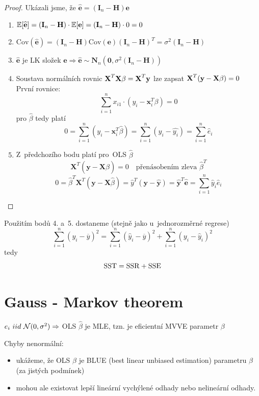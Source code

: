 \begin{proof}
Ukázali jsme, že $\widehat{\textbf{e}} = (\textbf{I}_n - \textbf{H}) \textbf{e}$
\begin{enumerate}
\item $\mathbb{E} [\widehat{\textbf{e}}] = (\textbf{I}_n - \textbf{H}) \cdot \mathbb{E} [\textbf{e}] = (\textbf{I}_n - \textbf{H}) \cdot 0 = 0$
\item $\text{Cov}(\widehat{\textbf{e}}) = (\textbf{I}_n - \textbf{H}) \text{Cov}(\textbf{e}) (\textbf{I}_n - \textbf{H})^T = \sigma^2 (\textbf{I}_n - \textbf{H})$
\item $\widehat{\textbf{e}}$ je LK složek $\textbf{e}  \Rightarrow  \widehat{\textbf{e}} \sim \textbf{N}_n (\textbf{0}, \sigma^2 (\textbf{I}_n - \textbf{H}))$
\item Soustava normálních rovnic $\textbf{X}^T \textbf{X} \beta = \textbf{X}^T \textbf{y}$ lze zapsat $\textbf{X}^T (\textbf{y} - \textbf{X} \beta) = 0$ \\
První rovnice:
 $$
 \sum_{i = 1}^n x_{i1} \cdot (y_i - \textbf{x}_i^T \beta) = 0
 $$
pro $\widehat{\beta}$ tedy platí
 $$
 0 = \sum_{i = 1}^n (y_i - \textbf{x}_i^T \widehat{\beta}) = \sum_{i = 1}^n (y_i - \widehat{y_i}) = \sum_{i = 1}^n \widehat{e}_i
 $$
\item Z~předchozího bodu platí pro~OLS $\widehat{\beta}$
 $$
 \textbf{X}^T (\textbf{y} - \textbf{X} \widehat{\beta}) = 0 \quad \text{přenásobením zleva } \widehat{\beta}^T
 $$
 $$
  0 = \widehat{\beta}^T \textbf{X}^T (\textbf{y} - \textbf{X} \widehat{\beta}) = \widehat{y}^T (\textbf{y} - \widehat{\textbf{y}}) = \widehat{\textbf{y}}^T \widehat{\textbf{e}} = \sum_{i = 1}^n \widehat{y}_i \widehat{e}_i
 $$
\end{enumerate}
\end{proof}
Použitím bodů 4. a~5. dostaneme (stejně jako u~jednorozměrné regrese)
 $$
  \sum_{i = 1}^n (y_i - \overline{y})^2 = \sum_{i = 1}^n (\widehat{y}_i - \overline{y})^2 + \sum_{i = 1}^n (y_i - \widehat{y}_i)^2
 $$
tedy
 $$
 \mathrm{SST} = \mathrm{SSR} + \mathrm{SSE}
 $$ \section{Gauss - Markov theorem}


 $e_i~iid~\mathcal{N}(0,\sigma^2) \Rightarrow$ OLS $\widehat{\beta}$ je MLE, tzn. je eficientní MVVE parametr $\beta$

Chyby nenormální:
\begin{itemize}
	\item ukážeme, že OLS $\widehat{\beta}$ je BLUE (best linear unbiased estimation) parametru $\beta$ (za jistých podmínek)
	\item mohou ale existovat lepší lineární vychýlené odhady nebo nelineární odhady.
\end{itemize}

